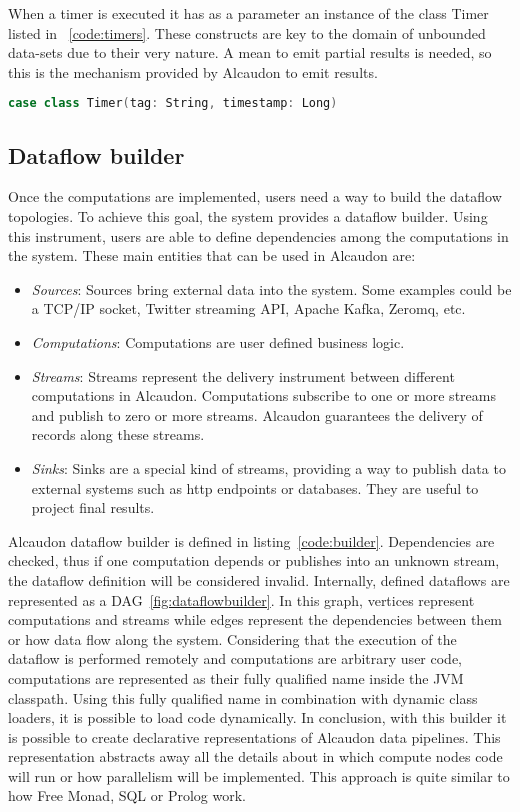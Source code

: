 When a timer is executed it has as a parameter an instance of the class Timer
listed in ~\ref{code:timers}. These constructs are key to the domain of unbounded
data-sets due to their very nature. A mean to emit partial results is needed, so
this is the mechanism provided by Alcaudon to emit results.

\begin{lstlisting}[language=scala, frame=trBL, label=code:timers, float=ht, caption = {Timer class}]
  case class Timer(tag: String, timestamp: Long)
\end{lstlisting}

\subsection{Dataflow builder}

Once the computations are implemented, users need a way to build the dataflow topologies.
To achieve this goal, the system provides a dataflow builder. Using this instrument,
users are able to define dependencies among the computations in the system.
These main entities that can be used in Alcaudon are:

\begin{itemize}
  \item \textit{Sources}: Sources bring external data into the system. Some
    examples could be a TCP/IP socket, Twitter streaming API, Apache Kafka,
    Zeromq, etc.
  \item \textit{Computations}: Computations are user defined business logic.
  \item \textit{Streams}: Streams represent the delivery instrument between
    different computations in Alcaudon. Computations subscribe to one or more
    streams and publish to zero or more streams. Alcaudon guarantees the
    delivery of records along these streams.
  \item \textit{Sinks}: Sinks are a special kind of streams, providing a way to
    publish data to external systems such as http endpoints or databases. They
    are useful to project final results.
\end{itemize}

Alcaudon dataflow builder is defined in listing~\ref{code:builder}. Dependencies
are checked, thus if one computation depends or publishes into an unknown stream,
the dataflow definition will be considered invalid. Internally, defined
dataflows are represented as a \acf{DAG}~\ref{fig:dataflowbuilder}. In this graph, vertices
represent computations and streams while edges represent the dependencies
between them or how data flow along the system. Considering that the execution
of the dataflow is performed remotely and computations are arbitrary user code,
computations are represented as their fully qualified name inside the \acs{JVM}
classpath. Using this fully qualified name in combination with dynamic class
loaders, it is possible to load code dynamically. In conclusion, with this builder
it is possible to create declarative representations of Alcaudon data pipelines.
This representation abstracts away all the details about in which compute nodes
code will run or how parallelism will be implemented. This approach is quite
similar to how Free Monad\cite{freemonad}, SQL or Prolog work.

